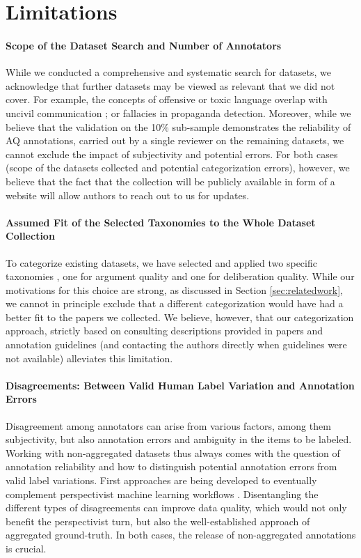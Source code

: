 \section*{Limitations}

\paragraph{Scope of the Dataset Search and Number of Annotators}
While we conducted a comprehensive and systematic search for datasets, we acknowledge that further datasets may be viewed as relevant that we did not cover. For example, the concepts of offensive or toxic language overlap with uncivil communication \cite{pachinger-etal-2023-toward}; or fallacies in propaganda detection. Moreover, while we believe that the validation on the 10\% sub-sample demonstrates the reliability of AQ annotations, carried out by a single reviewer on the remaining datasets, we cannot exclude the impact of subjectivity and potential errors. For both cases (scope of the datasets collected and potential categorization errors), however, we believe that the fact that the collection will be publicly available in form of a website will allow authors to reach out to us for updates.

\paragraph{Assumed Fit of the Selected Taxonomies to the Whole Dataset Collection} To categorize existing datasets, we have selected and applied two specific taxonomies \cite{wachsmuth-etal-2017-computational, friess2015deliberation}, one for argument quality and one for deliberation quality. While our motivations for this choice are strong, as discussed in Section \ref{sec:relatedwork}, we cannot in principle exclude that a different categorization would have had a better fit to the papers we collected. We believe, however, that our categorization approach, strictly based on consulting descriptions provided in papers and annotation guidelines (and contacting the authors directly when guidelines were not available) alleviates this limitation.

\paragraph{Disagreements: Between Valid Human Label Variation and Annotation Errors}
Disagreement among annotators can arise from various factors, among them subjectivity, but also annotation errors and ambiguity in the items to be labeled. Working with non-aggregated datasets thus always comes with the question of annotation reliability and how to distinguish potential annotation errors from valid label variations. First approaches are being developed to eventually complement perspectivist machine learning workflows \cite{weber-genzel-etal-2024-varierr}. Disentangling the different types of disagreements can improve data quality, which would not only benefit the perspectivist turn, but also the well-established approach of aggregated ground-truth. In both cases, the release of non-aggregated annotations is crucial.

